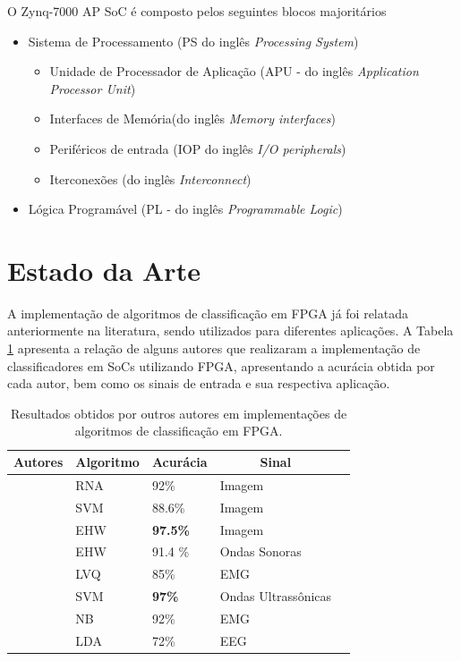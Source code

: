 O Zynq-7000 AP SoC é composto pelos seguintes blocos majoritários
\begin{itemize}
\item Sistema de Processamento (PS do inglês \textit{Processing System})
\begin{itemize}
\item Unidade de Processador de Aplicação (APU - do inglês \textit{Application Processor Unit})
\item  Interfaces de Memória(do inglês \textit{Memory interfaces})
\item  Periféricos de entrada (IOP do inglês \textit{I/O peripherals})
\item Iterconexões (do inglês \textit{Interconnect})
\end{itemize}
\item Lógica Programável (PL - do inglês \textit{Programmable Logic})
\end{itemize}

\section{Estado da Arte}
A implementação de algoritmos de classificação em FPGA já foi relatada anteriormente na literatura, sendo utilizados para diferentes aplicações. A Tabela \ref{estado_da_arte} apresenta a relação de alguns autores que realizaram a implementação de classificadores em SoCs utilizando FPGA, apresentando a acurácia obtida por cada autor, bem como os sinais de entrada e sua respectiva aplicação.

\begin{table}[h!]
	\centering
	\caption{Resultados obtidos por outros autores em implementações de algoritmos de classificação em FPGA.}
	\label{estado_da_arte}
	\begin{tabular}{|l|l|l|l|l|}
		\hline
		\multicolumn{1}{|c|}{\textbf{Autores}} & \multicolumn{1}{c|}{\textbf{Algoritmo}} &  \multicolumn{1}{c|}{\textbf{Acurácia}} & \multicolumn{1}{c|}{\textbf{Sinal}} \\ \hline
		\textit{\cite{RNAFPGA}} & RNA & 92\% & Imagem \\ \hline
		\textit{\cite{Irick}} & SVM  & 88.6\% & Imagem \\ \hline
		\textit{\cite{Glette2009}} & EHW  & \textbf{97.5\%} & Imagem \\ \hline
		\textit{\cite{Glette2007}} & EHW & 91.4 \% & Ondas Sonoras \\ \hline
		\textit{\cite{Alkim}} & LVQ & 85\% & EMG \\ \hline
		\textit{\cite{Yuan}} & SVM & \textbf{97\%} & Ondas Ultrassônicas \\ \hline
		\textit{\cite{Chen}} & NB & 92\% & EMG \\ \hline
		\textit{\cite{Kais}} & LDA & 72\% & EEG \\ \hline
	\end{tabular}
\end{table}

